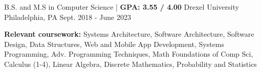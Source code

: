 

\begin{cventries}

  \cventry
  {B.S. and M.S in Computer Science | \textbf{ GPA: 3.55 / 4.00}} %
  {Drexel University} %
  {Philadelphia, PA} %
  {Sept. 2018 - June 2023} %
  {
    \begin{cvitems} %
      \item {\color{darktext} \textbf{Relevant coursework:}} Systems Architecture, Software Architecture, Software Design, Data Structures, Web and Mobile App Development, Systems Programming, Adv. Programming Techniques, Math Foundations of Comp Sci, Calculus (1-4), Linear Algebra, Discrete Mathematics, Probability and Statistics
    \end{cvitems}
  }

\end{cventries}
